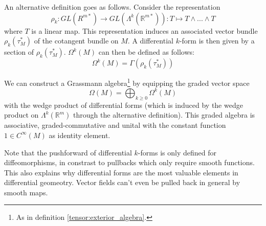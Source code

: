 	\begin{adefinition}
		An alternative definition goes as follows. Consider the representation \[\rho_k:GL(R^{m*})\rightarrow GL(\Lambda^k(\mathbb{R}^{m*})): T\mapsto T\wedge...\wedge T\] where $T$ is a linear map. This representation induces an associated vector bundle\footnotemark\ $\rho_k(\tau_M^*)$ of the cotangent bundle on $M$. A differential $k$-form is then given by a section of $\rho_k(\tau_M^*)$. $\Omega^k(M)$ can then be defined as follows: \[\Omega^k(M) = \Gamma(\rho_k(\tau_M^*))\]
	\end{adefinition}
	
	\begin{construct}
		We can construct a Grassmann algebra\footnote{As in definition \ref{tensor:exterior_algebra}.} by equipping the graded vector space
		\begin{equation}
			\Omega(M) = \bigoplus_{k\geq0}\Omega^k(M)
		\end{equation}
		with the wedge product of differential forms (which is induced by the wedge product on $\Lambda^k(\mathbb{R}^m)$ through the alternative definition). This graded algebra is associative, graded-commutative and unital with the constant function $1\in C^{\infty}(M)$ as identity element.
	\end{construct}

	\begin{remark*}
		Note that the pushforward of differential $k$-forms is only defined for diffeomorphisms, in constrast to pullbacks which only require smooth functions. This also explains why differential forms are the most valuable elements in differential geomeotry. Vector fields can't even be pulled back in general by smooth maps.
	\end{remark*}
	
